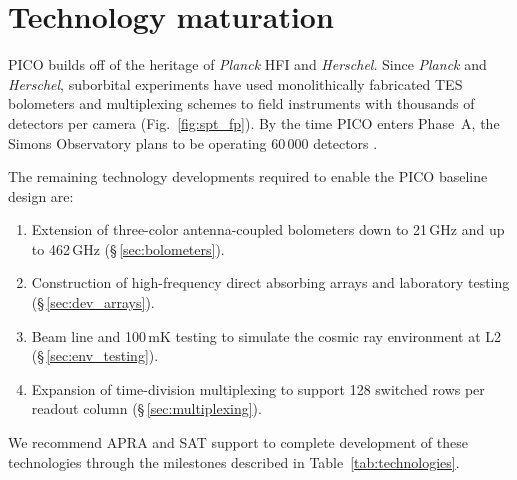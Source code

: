 \bigskip
\section{Technology maturation}
\label{sec:technology_maturation} %

PICO builds off of the heritage of \textit{Planck} HFI and
\textit{Herschel}.  Since \textit{Planck} and \textit{Herschel},
suborbital experiments have used monolithically fabricated TES
bolometers and multiplexing schemes to field instruments with
thousands of detectors per camera (Fig.~\ref{fig:spt_fp}). By the
time PICO enters Phase~A, the Simons Observatory plans to be operating
60\,000 detectors \citep{Simons2018}.

 The remaining technology developments required to enable the PICO baseline design are:
\begin{enumerate}
\item Extension of three-color antenna-coupled bolometers down to 21\,GHz and up to 462\,GHz (\S\,\ref{sec:bolometers}).
\item Construction of high-frequency direct absorbing arrays and laboratory testing (\S\,\ref{sec:dev_arrays}).
\item Beam line and 100\,mK testing to simulate the cosmic ray environment at L2 (\S\,\ref{sec:env_testing}).
\item Expansion of time-division multiplexing to support 128 switched rows per readout column (\S\,\ref{sec:multiplexing}).
\end{enumerate}
We recommend APRA and SAT support to complete development of these
technologies through the milestones described in Table~\ref{tab:technologies}.





